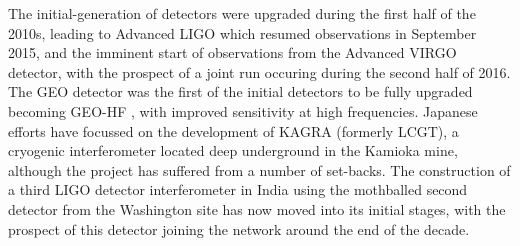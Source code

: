 The initial-generation of detectors were upgraded during the first
half of the 2010s, leading to Advanced LIGO\cite{2015CQGra..32g4001L}
which resumed observations in September 2015, and the imminent start
of observations from the Advanced VIRGO
detector\cite{2015CQGra..32b4001A}, with the prospect of a joint run
occuring during the second half of 2016. The GEO detector was the
first of the initial detectors to be fully upgraded becoming GEO-HF
\cite{2006CQGra..23S.207W}, with improved sensitivity at high
frequencies. Japanese efforts have focussed on the development of
KAGRA (formerly LCGT), a cryogenic interferometer located deep
underground in the Kamioka mine\cite{1999IJMPD...8..557K}, although
the project has suffered from a number of set-backs. The construction
of a third LIGO detector interferometer in India using the mothballed
second detector from the Washington site has now moved into its
initial stages, with the prospect of this detector joining the network
around the end of the decade.


